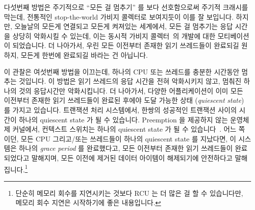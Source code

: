 다섯번째 방법은 주기적으로 ``모든 걸 멈추기'' 를 보다 선호함으로써 주기적
크래시를 막는데, 전통적인 stop-the-world 가비지 콜렉터로 보여지듯이 이를 잘
보입니다.
하지만, 오늘날의 모든게 연결되고 모든게 켜져있는 세계에서, 모든 걸 멈추기는
응답 시간을 상당히 악화시킬 수 있는데, 이는 동시적 가비지
콜렉터~\cite{DavidFBacon2003RTGC}의 개발에 대한 모티베이션이 되었습니다.
더 나아가서, 우린 모든 이전부터 존재한 읽기 쓰레드들이 완료되길 원하지, 모든게
한번에 완료되길 바라는 건 아닙니다.

이 관찰은 여섯번째 방법을 이끄는데, 하나의 CPU 또는 쓰레드를 충분한 시간동안
멈추는 것입니다.
이 방법은 읽기 쓰레드의 응답 시간을 전혀 악화시키지 않고, 멈춰진 하나의 것의
응답시간만 악화시킵니다.
더 나아가서, 다양한 어플리케이션이 이미 모든 이전부터 존재한 읽기 쓰레드들이
완료된 후에야 도달 가능한 상태 (\emph{quiescent state}) 를 가지고 있습니다.
트랜잭션 처리 시스템에서, 한쌍의 성공적인 트랜잭션 사이의 시간이 하나의
quiescent state 가 될 수 있습니다.
Preemption 을 제공하지 않는 운영체제 커널에서, 컨텍스트 스위치는 하나의
quiescent state 가 될 수 있습니다~\cite{McKenney98}.
어느 쪽이던, 모든 CPU 그리고/또는 쓰레드들이 하나의 quiescent state 를
지났다면, 이 시스템은 하나의 \emph{grace period} 를 완료했다고, 모든 이전부터
존재한 읽기 쓰레드들이 완료되었다고 말해지며, 모든 이전에 제거된 데이터
아이템이 해제되기에 안전하다고 말해집니다.\footnote{
	단순히 메모리 회수를 지연시키는 것보다 RCU 는 더 많은 걸 할 수
	있습니다만, 메모리 회수 지연은 시작하기에 좋은 내용입니다.}

